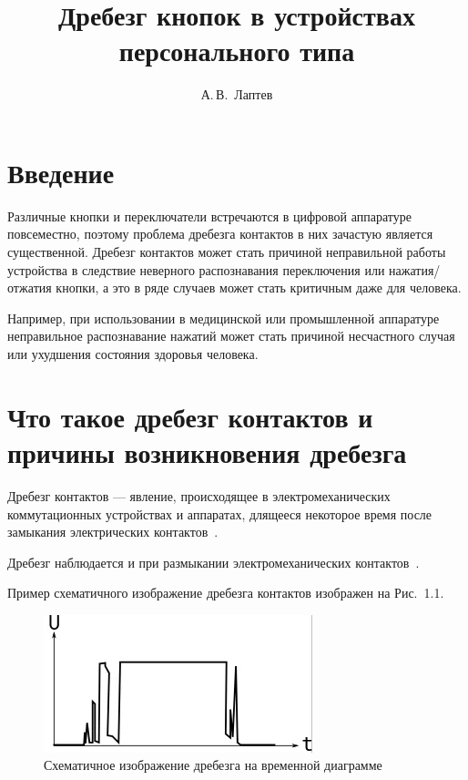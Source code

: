 \documentclass{altsu-report}
\title{Дребезг кнопок в устройствах персонального типа}
\author{А.\,В.~Лаптев}
\institute{Институт цифровых технологий, электроники и физики}
\date{\the\year}
\begin{document}
\maketitle

\setcounter{page}{2}
\makeabstract
\tableofcontents

\chapter*{Введение}

Различные кнопки и переключатели встречаются в цифровой аппаратуре повсеместно, поэтому проблема дребезга контактов в них зачастую является существенной. Дребезг контактов может стать причиной неправильной работы устройства в следствие неверного распознавания переключения или нажатия/отжатия кнопки, а это в ряде случаев может стать критичным даже для человека.

Например, при использовании в медицинской или промышленной аппаратуре неправильное распознавание нажатий может стать причиной несчастного случая или ухудшения состояния здоровья человека.

\chapter{Что такое дребезг контактов и причины возникновения дребезга}

Дребезг контактов --- явление, происходящее в электромеханических коммутационных устройствах и аппаратах, длящееся некоторое время после замыкания электрических контактов~\cite{STM, chatter}.

Дребезг наблюдается и при размыкании электромеханических контактов~\cite{schem}.

Пример схематичного изображение дребезга контактов изображен на Рис.~1.1.

\begin{figure}[H]
    \centering
    \includegraphics[scale=1.5]{chatter.png}
    \caption{Схематичное изображение дребезга на временной диаграмме}
    \label{fig:chatter}
\end{figure}
\end{document}
